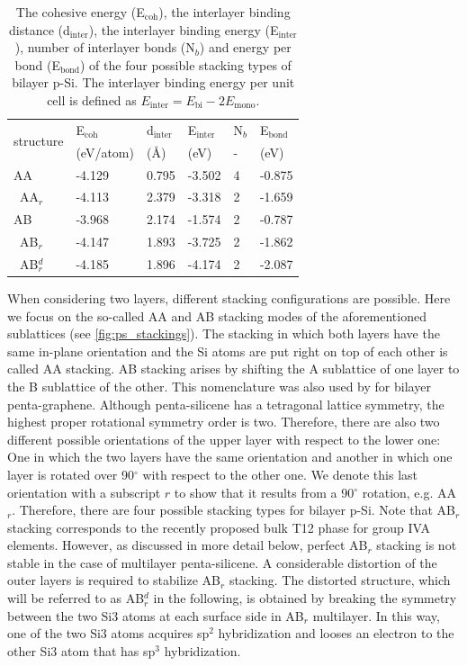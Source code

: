 \begin{table}[htb]
\centering
\caption{The cohesive energy (E$_{\text{coh}}$), the interlayer binding distance (d$_{\text{inter}}$), the interlayer binding energy (E$_{\text{inter}}$), number of interlayer bonds (N$_b$) and energy per bond (E$_{\text{bond}}$) of the four possible stacking types of bilayer p-Si. The interlayer binding energy per unit cell is defined as $E_{\text{inter}}=E_{\text{bi}}-2E_{\text{mono}}$. \label{bilayer_table}}
\begin{tabularx}{\textwidth}{@{\extracolsep{\fill}}X|XXXXX}
\hline\hline
\multirow{2}{*}{structure}  & E$_{\text{coh}}$ & d$_{\text{inter}}$ & E$_{\text{inter}}$& N$_b$ & E$_{\text{bond}}$ \\ 
 & (eV/atom) & (\AA) & (eV) & - & (eV) \\ \hline
AA & -4.129 & 0.795   & -3.502  & 4 & -0.875 \\
~AA$_r$ & -4.113 & 2.379   & -3.318  & 2 & -1.659 \\
AB & -3.968 & 2.174   & -1.574  & 2 & -0.787 \\
~AB$_r$ & -4.147 & 1.893   & -3.725  & 2 & -1.862 \\
~AB$_r^d$ & -4.185 & 1.896   & -4.174  & 2 & -2.087 \\ 
\hline\hline
\end{tabularx}
\end{table}

When considering two layers, different stacking configurations are possible. Here we focus on the so-called AA and AB stacking modes of the aforementioned sublattices (see \autoref{fig:ps_stackings}). The stacking in which both layers have the same in-plane orientation and the Si atoms are put right on top of each other is called AA stacking. AB stacking arises by shifting the A sublattice of one layer to the B sublattice of the other. This nomenclature was also used by \citet{Wang2015} for bilayer penta-graphene. Although penta-silicene has a tetragonal lattice symmetry, the highest proper rotational symmetry order is two. Therefore, there are also two different possible orientations of the upper layer with respect to the lower one:  One in which the two layers have the same orientation and another in which one layer is rotated over 90$^{\circ}$ with respect to the other one. We denote this last orientation with a subscript $r$ to show that it results from a 90$^{\circ}$ rotation, e.g. AA$_r$. Therefore, there are four possible stacking types for bilayer p-Si. Note that AB$_r$ stacking corresponds to the recently proposed bulk T12 phase for group IVA elements\cite{Zhisheng2012}. However, as discussed in more detail below, perfect AB$_r$ stacking is not stable in the case of multilayer penta-silicene.  A considerable distortion of the outer layers is required to stabilize AB$_r$ stacking. The distorted structure, which will be referred to as AB$_r^d$ in the following, is obtained by breaking the symmetry between the two Si3 atoms at each surface side in AB$_r$ multilayer. In this way, one of the two Si3 atoms acquires sp$^2$ hybridization and looses an electron to the other Si3 atom that has sp$^3$ hybridization.

